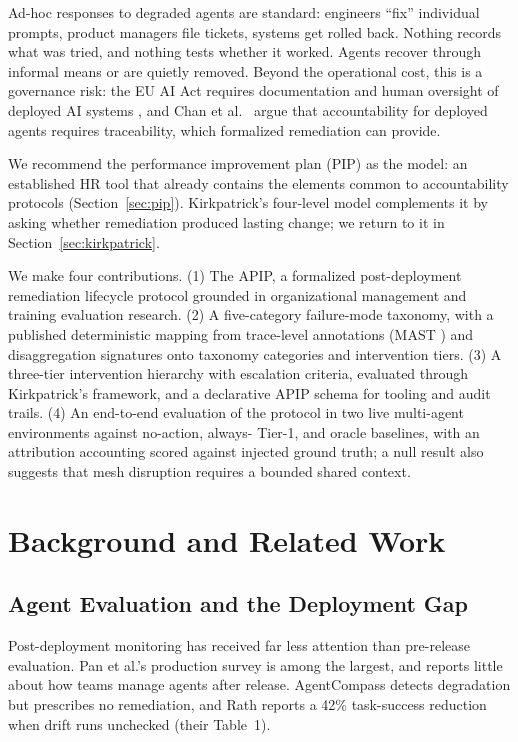 \documentclass[conference]{IEEEtran}
\begin{document}
Ad-hoc responses to degraded agents are standard: engineers ``fix'' individual
prompts, product managers file tickets, systems get rolled back. Nothing
records what was tried, and nothing tests whether it worked. Agents recover
through informal means or are quietly removed. Beyond the operational cost,
this is a governance risk: the EU AI Act requires documentation and human
oversight of deployed AI systems \cite{euaiact}, and Chan et al.\
\cite{chan2024} argue that accountability for deployed agents requires
traceability, which formalized remediation can provide.

We recommend the performance improvement plan (PIP) as the model: an
established HR tool that already contains the elements common to
accountability protocols (Section~\ref{sec:pip}). Kirkpatrick's
four-level model \cite{kirkpatrick1994} complements it by asking whether
remediation produced lasting change; we return to it in
Section~\ref{sec:kirkpatrick}.

We make four contributions. (1) The APIP, a formalized post-deployment
remediation lifecycle protocol grounded in organizational management and
training evaluation research. (2) A five-category failure-mode taxonomy, with
a published deterministic mapping from trace-level annotations (MAST
\cite{cemri2025}) and disaggregation signatures onto taxonomy categories and
intervention tiers. (3) A three-tier intervention hierarchy with escalation
criteria, evaluated through Kirkpatrick's framework, and a declarative APIP
schema for tooling and audit trails. (4) An end-to-end evaluation of the
protocol in two live multi-agent environments against no-action, always-
Tier-1, and oracle baselines, with an attribution accounting scored against
injected ground truth; a null result also suggests that mesh disruption
requires a bounded shared context.

\section{Background and Related Work}

\subsection{Agent Evaluation and the Deployment Gap}

Post-deployment monitoring has received far less attention than pre-release
evaluation. Pan et al.'s production survey \cite{pan2025} is among the largest,
and reports little about how teams manage agents after release.
AgentCompass \cite{kartik2025} detects degradation but prescribes no
remediation, and Rath \cite{rath2026} reports a 42\% task-success reduction
when drift runs unchecked (their Table~1).
\end{document}
